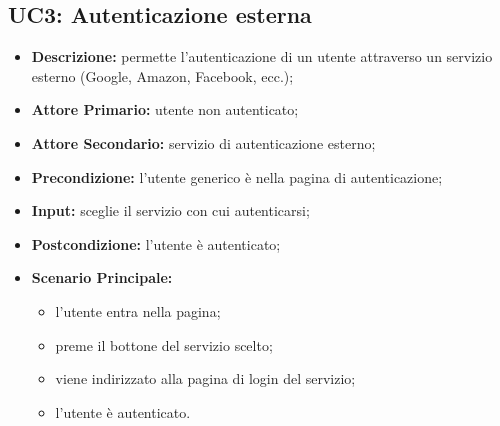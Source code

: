 \subsection{UC3: Autenticazione esterna}
\label{sec:UC3}
\begin{itemize}
    \item \textbf{Descrizione:} permette l'autenticazione di un utente attraverso un servizio esterno (Google, Amazon, Facebook, ecc.);
    \item \textbf{Attore Primario:} utente non autenticato;
    \item \textbf{Attore Secondario:} servizio di autenticazione esterno;
    \item \textbf{Precondizione:} l'utente generico è nella pagina di autenticazione;
    \item \textbf{Input:} sceglie il servizio con cui autenticarsi;
    \item \textbf{Postcondizione:} l'utente è autenticato;
    \item \textbf{Scenario Principale:}
          \begin{itemize}
              \item l'utente entra nella pagina;
              \item preme il bottone del servizio scelto;
              \item viene indirizzato alla pagina di login del servizio;
              \item l'utente è autenticato.
          \end{itemize}
\end{itemize}
